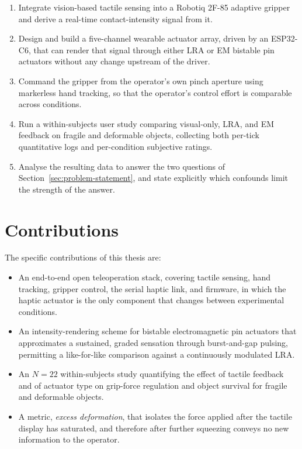 \documentclass[12pt, a4paper, twoside, openright]{report}
\begin{document}
\begin{enumerate}
    \item Integrate vision-based tactile sensing into a Robotiq 2F-85 adaptive
          gripper and derive a real-time contact-intensity signal from it.
    \item Design and build a five-channel wearable actuator array, driven by an
          ESP32-C6, that can render that signal through either LRA or EM
          bistable pin actuators without any change upstream of the driver.
    \item Command the gripper from the operator's own pinch aperture using
          markerless hand tracking, so that the operator's control effort is
          comparable across conditions.
    \item Run a within-subjects user study comparing visual-only, LRA, and EM
          feedback on fragile and deformable objects, collecting both
          per-tick quantitative logs and per-condition subjective ratings.
    \item Analyse the resulting data to answer the two questions of
          Section~\ref{sec:problem-statement}, and state explicitly which
          confounds limit the strength of the answer.
\end{enumerate}

\section{Contributions}
\label{sec:contributions}

The specific contributions of this thesis are:

\begin{itemize}
    \item An end-to-end open teleoperation stack, covering tactile sensing,
          hand tracking, gripper control, the serial haptic link, and firmware,
          in which the haptic actuator is the only component that changes between
          experimental conditions.
    \item An intensity-rendering scheme for bistable electromagnetic pin
          actuators that approximates a sustained, graded sensation through
          burst-and-gap pulsing, permitting a like-for-like comparison against
          a continuously modulated LRA.
    \item An $N=22$ within-subjects study quantifying the effect of tactile
          feedback and of actuator type on grip-force regulation and object
          survival for fragile and deformable objects.
    \item A metric, \emph{excess deformation}, that isolates the force applied
          after the tactile display has saturated, and therefore after further
          squeezing conveys no new information to the operator.
\end{itemize}
\end{document}
